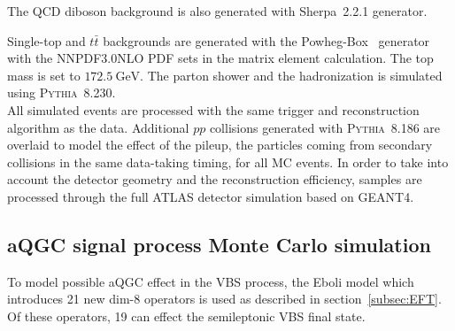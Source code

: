 The QCD diboson background is also generated with Sherpa~2.2.1 generator. 

Single-top and $t\bar{t}$ backgrounds are generated with the Powheg-Box~\cite{Alioli:2010xd} generator with the NNPDF3.0NLO PDF\cite{Ball:2014uwa} sets in the matrix element calculation. The top mass is set to $172.5~\mathrm{GeV}$. The parton shower and the hadronization is simulated using \textsc{Pythia}~8.230. \\

All simulated events are processed with the same trigger and reconstruction algorithm as the data.
Additional $pp$ collisions generated with \textsc{Pythia}~8.186\cite{Sjostrand:2008vc} are overlaid to model the effect of the pileup, the particles coming from secondary collisions in the same data-taking timing, for all MC events.
In order to take into account the detector geometry and the reconstruction efficiency, samples are processed through the full ATLAS detector simulation\cite{SOFT-2010-01} based on \textsc{GEANT4}\cite{Agostinelli:2002hh}.

\subsection{aQGC signal process Monte Carlo simulation}
To model possible aQGC effect in the VBS process, the Eboli model \cite{eboli2006p} which introduces 21 new dim-8 operators is used as described in section~\ref{subsec:EFT}.
Of these operators, 19 can effect the semileptonic VBS final state.

